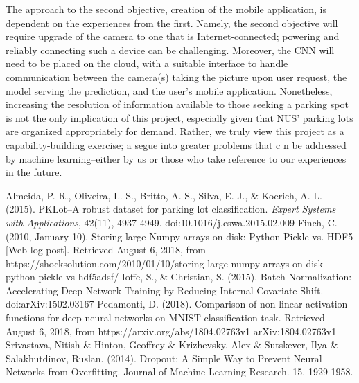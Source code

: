 \documentclass[a4paper, 11pt]{article} %
\begin{document}
	The approach to the second objective, creation of the mobile application, is
	dependent on the experiences from the first. Namely, the second objective will
	require upgrade of the camera to one that is Internet-connected; powering and
	reliably connecting such a device can be challenging.  Moreover, the CNN will
	need to be placed on the cloud, with a suitable interface to handle
	communication between the camera(s) taking the picture upon user request, the
	 model serving the prediction, and the user's mobile application.
	  Nonetheless, increasing the
	resolution of information available to those seeking a parking spot is not the
	only implication of this project, especially given that NUS' parking lots are
	organized appropriately for demand. Rather, we truly view this project as a
	capability-building exercise; a segue into greater problems that c n be
	addressed by machine learning--either by us or those who take reference to our
	experiences in the future.

\newpage
\begin{thebibliography}{unsrt}
		Almeida, P. R., Oliveira, L. S., Britto, A. S., Silva, E. J., \& Koerich, A. L. (2015). PKLot--A robust 
		dataset for parking lot classification. \textit{Expert Systems with Applications}, 42(11), 
		4937-4949. doi:10.1016/j.eswa.2015.02.009
		Finch, C. (2010, January 10). Storing large Numpy arrays on disk: 
		Python Pickle vs. HDF5 [Web log post]. Retrieved August 6, 2018, from 
		https://shocksolution.com/2010/01/10/storing-large-numpy-arrays-on-disk-python-pickle-vs-hdf5adsf/
		Ioffe, S., \& Christian, S. (2015). Batch Normalization: Accelerating 
		Deep Network Training by Reducing Internal Covariate Shift. 
		doi:arXiv:1502.03167
		Pedamonti, D. (2018). Comparison of non-linear activation functions for 
		deep neural networks on MNIST classification task. Retrieved August 6, 
		2018, from https://arxiv.org/abs/1804.02763v1 arXiv:1804.02763v1
		Srivastava, Nitish \& Hinton, Geoffrey \& Krizhevsky, Alex \& 
		Sutskever, Ilya \& Salakhutdinov, Ruslan. (2014). Dropout: A Simple Way 
		to Prevent Neural Networks from Overfitting. Journal of Machine 
		Learning Research. 15. 1929-1958.
\end{thebibliography}
\end{document}
